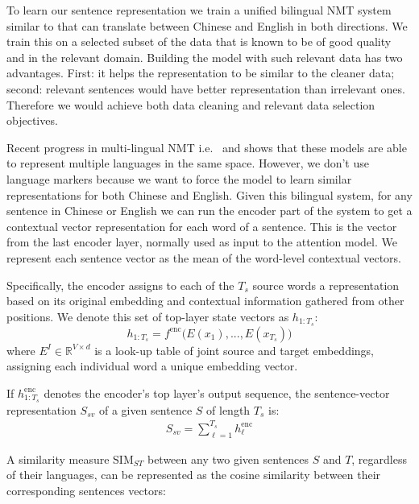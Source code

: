 \documentclass[a4paper]{article}
\begin{document}
\begin{CJK*}{UTF8}{gbsn}
To learn our sentence representation we train a unified bilingual NMT system similar to \cite{zoph2016transfer} that can translate between Chinese and English in both directions. We train this on a selected subset of the data  that is known to be of good quality and in the relevant domain. Building the model with such relevant data has two advantages. First: it helps the representation to be similar to the cleaner data; second: relevant sentences would have better representation than irrelevant ones. Therefore we would achieve both data cleaning and relevant data selection objectives.


Recent progress in  multi-lingual NMT i.e.\ \cite{johnson2016google} and \cite{unimt} shows that these models are able to represent multiple languages in the same space. However, we don't use language markers because we want to force the model to learn similar representations for both Chinese and English. Given this bilingual system, for any sentence in Chinese or English we can run the encoder part of the system to get a contextual vector representation for each word of a sentence. This is the vector from the last encoder layer, normally used as input to the attention model. We represent each sentence vector as the mean of the word-level contextual vectors.

Specifically, the encoder assigns to each of the $T_s$ source words a representation based on its original embedding and contextual information gathered from other positions. We denote this set of  top-layer state vectors as $h_{1:T_s}$:
\begin{equation}
h_{1: T_s} = f^{\text{enc}}\bigl(E(x_1), ..., E(x_{T_s})) 
\label{eq.encoder}
\end{equation}
where $E^I \in \mathbb{R}^{V \times d}$ is a look-up table of joint source and target embeddings, assigning each individual word a unique embedding vector.

If $h^{\mathrm{enc}}_{1:T_s}$ denotes the encoder's top layer's output sequence,
the sentence-vector representation $S_{sv}$ of a given sentence $S$ of length $T_s$ is:
\begin{equation}
	\begin{split}
	S_{sv}=\sum_{\ell=1}^{T_s}h^{\mathrm{enc}}_{\ell}
	\end{split}
	 \label{eq.sentvec} 
\end{equation}

A similarity measure  $\mathrm{SIM}_{ST}$ between any two given sentences $S$ and $T$, regardless of their languages, can be represented as the cosine similarity between their corresponding sentences vectors:


\end{CJK*}
\end{document}

